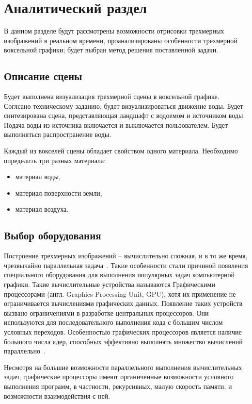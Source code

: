 \chapter{Аналитический раздел}

В данном разделе будут рассмотрены возможности отрисовки 
трехмерных изображений в реальном времени, проанализированы особенности трехмерной 
воксельной графики; будет выбран метод решения поставленной задачи.

\section{Описание сцены}

Будет выполнена визуализация трехмерной сцены в воксельной графике. Соглсано
техническому заданию, будет визуализироваться движение воды. Будет синтезирована 
сцена, представляющая ландшафт с водоемом и источником воды. Подача воды из источника
включается и выключается пользователем. Будет выполняться распространение воды.

Каждый из вокселей сцены обладает свойством одного материала. 
Необходимо определить три разных материала: 
\begin{itemize}
    \item материал воды,
    \item материал поверхности земли,
    \item материал воздуха.
\end{itemize}

\section{Выбор оборудования}

Построение трехмерных изображений -- вычислительно сложная, и в то же время, чрезвычайно 
параллельная задача~\cite{DaBPP}. Такие особенности стали причиной появления специального оборудования 
для выполнения популярных задач компьютерной графики. Такие вычислительные устройства
называются Графическими процессорами (англ. Graphics Processing Unit, GPU), хотя их применение не ограничивается вычислениями
графических данных. Появление таких устройств вызвано ограничениями в разработке центральных
процессоров. Они используются для последовательного выполнения кода с большим числом условных 
переходов.
Особенностью графических процессоров является наличие большого числа ядер, способных эффективно 
выполнять множество вычислений параллельно~\cite{ACLaG}.

Несмотря на большие возможности параллельного выполнения вычислительных задач,
графические процессоры имеют органиченные возможности условного выполнения программ, в 
частности, рекурсивных, малую скорость памяти, и возможности взаимодействия с ней.

